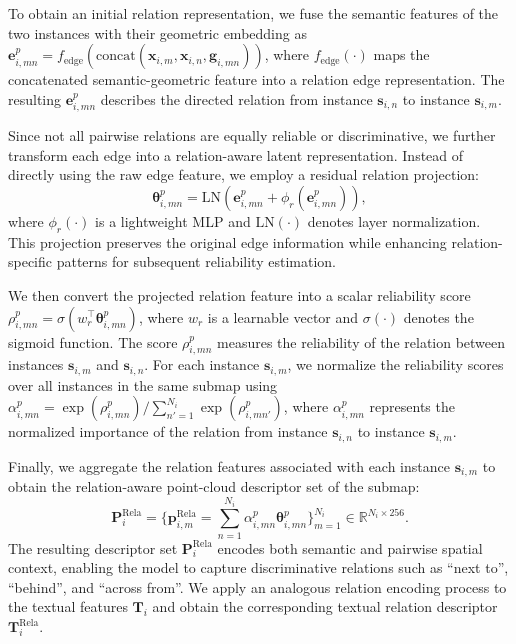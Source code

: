 \documentclass{article}
\begin{document}
To obtain an initial relation representation, we fuse the semantic features of the two instances with their geometric embedding as $\mathbf{e}^{p}_{i,mn}=f_{\mathrm{edge}}(\mathrm{concat}(\mathbf{x}_{i,m},\mathbf{x}_{i,n},\mathbf{g}_{i,mn}))$, where $f_{\mathrm{edge}}(\cdot)$ maps the concatenated semantic-geometric feature into a relation edge representation. The resulting $\mathbf{e}^{p}_{i,mn}$ describes the directed relation from instance $\mathbf{s}_{i,n}$ to instance $\mathbf{s}_{i,m}$.

Since not all pairwise relations are equally reliable or discriminative, we further transform each edge into a relation-aware latent representation. Instead of directly using the raw edge feature, we employ a residual relation projection:
\begin{equation}
\boldsymbol{\theta}^{p}_{i,mn}
=
\mathrm{LN}
\left(
\mathbf{e}^{p}_{i,mn}
+
\phi_r
\left(
\mathbf{e}^{p}_{i,mn}
\right)
\right),
\end{equation}
where $\phi_r(\cdot)$ is a lightweight MLP and $\mathrm{LN}(\cdot)$ denotes layer normalization. This projection preserves the original edge information while enhancing relation-specific patterns for subsequent reliability estimation.

We then convert the projected relation feature into a scalar reliability score 
$\rho^{p}_{i,mn}=\sigma(w_r^{\top}\boldsymbol{\theta}^{p}_{i,mn})$, 
where $w_r$ is a learnable vector and $\sigma(\cdot)$ denotes the sigmoid function. 
The score $\rho^{p}_{i,mn}$ measures the reliability of the relation between instances 
$\mathbf{s}_{i,m}$ and $\mathbf{s}_{i,n}$. 
For each instance $\mathbf{s}_{i,m}$, we normalize the reliability scores over all instances 
in the same submap using 
$\alpha^{p}_{i,mn}=\exp(\rho^{p}_{i,mn})/\sum_{n'=1}^{N_i}\exp(\rho^{p}_{i,mn'})$, 
where $\alpha^{p}_{i,mn}$ represents the normalized importance of the relation from instance 
$\mathbf{s}_{i,n}$ to instance $\mathbf{s}_{i,m}$.

Finally, we aggregate the relation features associated with each instance $\mathbf{s}_{i,m}$ 
to obtain the relation-aware point-cloud descriptor set of the submap:
\begin{equation}
\mathbf{P}^{\mathrm{Rela}}_i
=
\big\{
\mathbf{p}^{\mathrm{Rela}}_{i,m}
=
\sum_{n=1}^{N_i}
\alpha^{p}_{i,mn}
\boldsymbol{\theta}^{p}_{i,mn}
\big\}_{m=1}^{N_i}
\in \mathbb{R}^{N_i \times 256}.
\end{equation}
The resulting descriptor set $\mathbf{P}^{\mathrm{Rela}}_i$ encodes both semantic and pairwise spatial context, enabling the model to capture discriminative relations such as ``next to'', ``behind'', and ``across from''. We apply an analogous relation encoding process to the textual features $\mathbf{T}_i$ and obtain the corresponding textual relation descriptor $\mathbf{T}^{\mathrm{Rela}}_i$.
\end{document}
